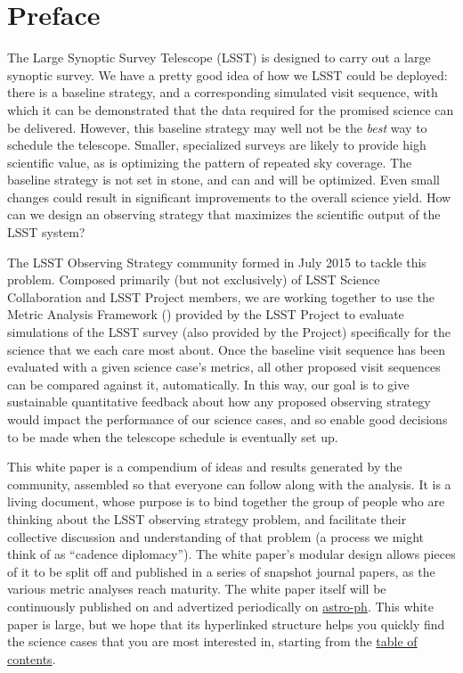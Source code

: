 \setcounter{chapter}{0}
\chapter*{Preface}
\def\chpname{preface}\label{chp:\chpname}
\markboth{}{}

\noindent The Large Synoptic Survey Telescope (LSST) is designed to
carry out a large synoptic survey.  We have a pretty good idea of how we
LSST could be deployed: there is a baseline strategy, and a
corresponding simulated visit sequence, with which it can be
demonstrated that the data required for the promised science can be
delivered. However, this baseline strategy may well not be the {\it
best} way to schedule the telescope. Smaller, specialized surveys are
likely to provide high scientific value, as is optimizing the pattern of
repeated sky coverage.  The baseline strategy is not set in stone, and
can and will be optimized. Even small changes could result in
significant improvements to the overall science yield. How can we design
an observing strategy that maximizes the scientific output of the LSST
system?

\noindent The LSST Observing Strategy community formed in July 2015 to
tackle this problem. Composed primarily (but not exclusively) of  LSST
Science Collaboration and LSST Project members, we are working together
to use the Metric Analysis Framework (\MAF) provided by the LSST Project
to evaluate \OpSim simulations of the LSST survey (also provided by the
Project) specifically for the science that we each care most about. Once
the baseline visit sequence has been evaluated with a given science
case's metrics, all other proposed visit sequences can be compared
against it, automatically. In this way, our goal is to give sustainable
quantitative feedback about how any proposed observing strategy would
impact the performance of our science cases, and so enable good
decisions to be made when the telescope schedule  is eventually set up.

\noindent This white paper is a compendium of ideas and results
generated by the community, assembled so that everyone can follow along
with the analysis. It is a living document, whose purpose is to bind
together the group of people who are thinking about the LSST observing
strategy problem, and facilitate their collective discussion and
understanding of that problem (a process we might think of as  ``cadence
diplomacy''). The white paper's modular design allows pieces of it to be
split off and published in a series of snapshot journal papers, as the
various metric analyses reach maturity. The white paper itself will be
continuously published on
\href{https://github.com/LSSTScienceCollaborations/ObservingStrategy}{\GitHub}
and advertized periodically on \href{http://arxiv.org}{astro-ph}. This
white paper is large, but we hope that its hyperlinked structure helps
you quickly find the science cases that you are most interested in,
starting from the \hyperref[toc]{table of contents}.

